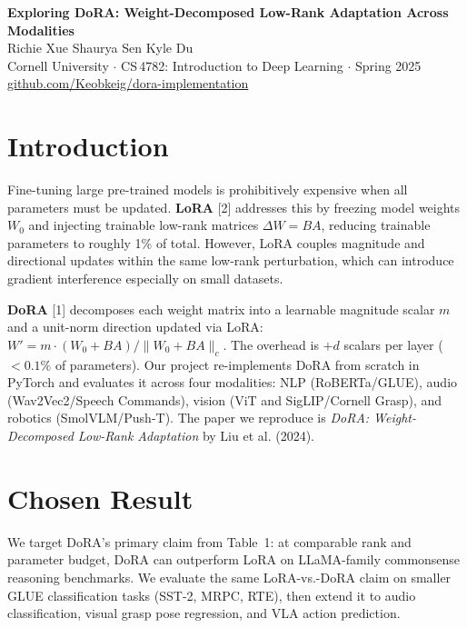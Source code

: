 \documentclass[11pt]{article}
\begin{document}
\begin{center}
	{\large\textbf{Exploring DoRA: Weight-Decomposed Low-Rank Adaptation Across Modalities}}\\[4pt]
	Richie Xue \quad Shaurya Sen \quad Kyle Du\\
	Cornell University $\cdot$ CS\,4782: Introduction to Deep Learning $\cdot$ Spring 2025\\
	\href{https://github.com/Keobkeig/dora-implementation}{github.com/Keobkeig/dora-implementation}
\end{center}
\vspace{3pt}
\vspace{1pt}

\section{Introduction}

Fine-tuning large pre-trained models is prohibitively expensive when all parameters must be updated.
\textbf{LoRA} [2] addresses this by freezing model weights $W_0$ and injecting trainable low-rank matrices $\Delta W = BA$, reducing trainable parameters to roughly 1\% of total.
However, LoRA couples magnitude and directional updates within the same low-rank perturbation, which can introduce gradient interference especially on small datasets.

\textbf{DoRA} [1] decomposes each weight matrix into a learnable magnitude scalar $m$ and a unit-norm direction updated via LoRA: $W' = m \cdot (W_0{+}BA)/\|W_0{+}BA\|_c$.
The overhead is $+d$ scalars per layer ($<0.1\%$ of parameters). Our project re-implements DoRA from scratch in PyTorch and evaluates it across four modalities: NLP (RoBERTa/GLUE), audio (Wav2Vec2/Speech Commands), vision (ViT and SigLIP/Cornell Grasp), and robotics (SmolVLM/Push-T).
The paper we reproduce is \emph{DoRA: Weight-Decomposed Low-Rank Adaptation} by Liu et al. (2024).

\section{Chosen Result}

We target DoRA's primary claim from Table~1: at comparable rank and parameter budget, DoRA can outperform LoRA on LLaMA-family commonsense reasoning benchmarks.
We evaluate the same LoRA-vs.-DoRA claim on smaller GLUE classification tasks (SST-2, MRPC, RTE), then extend it to audio classification, visual grasp pose regression, and VLA action prediction.
\end{document}
